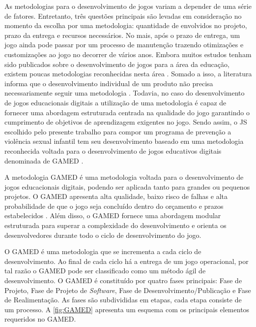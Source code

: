 As metodologias para o desenvolvimento de jogos variam a depender de uma série de fatores. Entretanto, três questões principais são levadas em consideração no momento da escolha por uma metodologia: quantidade de envolvidos no projeto, prazo da entrega e recursos necessários. No mais, após o prazo de entrega, um jogo ainda pode passar por um processo de manutenção trazendo otimizações e customizações ao jogo no decorrer de vários anos. Embora muitos estudos tenham sido publicados sobre o desenvolvimento de jogos para a área da educação, existem poucas metodologias reconhecidas nesta área \cite{aslan2015gamed}. Somado a isso, a literatura informa que o desenvolvimento individual de um produto não precisa necessariamente seguir uma metodologia \cite{valente2021engenharia}. Todavia, no caso do desenvolvimento de jogos educacionais digitais a utilização de uma metodologia é capaz de fornecer uma abordagem estruturada centrada na qualidade do jogo garantindo o cumprimento de objetivos de aprendizagem exigentes no jogo. Sendo assim, o \ac{JS} escolhido pelo presente trabalho para compor um programa de prevenção a violência sexual infantil tem seu desenvolvimento baseado em uma metodologia reconhecida voltada para o desenvolvimento de jogos educativos digitais denominada de \ac{GAMED} \cite{aslan2016digital}. 

A metodologia \ac{GAMED} é uma metodologia voltada para o desenvolvimento de jogos educacionais digitais, podendo ser aplicada tanto para grandes ou pequenos projetos. O \ac{GAMED} apresenta alta qualidade, baixo risco de falhas e alta probabilidade de que o jogo seja concluído dentro do orçamento e prazos estabelecidos \cite{aslan2015gamed}. Além disso, o \ac{GAMED} fornece uma abordagem modular estruturada para superar a complexidade do desenvolvimento e orienta os desenvolvedores durante todo o ciclo de desenvolvimento do jogo.

O \ac{GAMED} é uma metodologia que se incrementa a cada ciclo de desenvolvimento. Ao final de cada ciclo há a entrega de um jogo operacional, por tal razão o \ac{GAMED} pode ser classificado como um método ágil de desenvolvimento. O \ac{GAMED} é constituído por quatro fases principais: Fase de Projeto, Fase de Projeto de \textit{Software}, Fase de Desenvolvimento/Publicação e Fase de Realimentação. As fases são subdivididas em etapas, cada etapa consiste de um processo. A \autoref{fig:GAMED} apresenta um esquema com os principais elementos requeridos no \ac{GAMED}. 

\pagebreak

